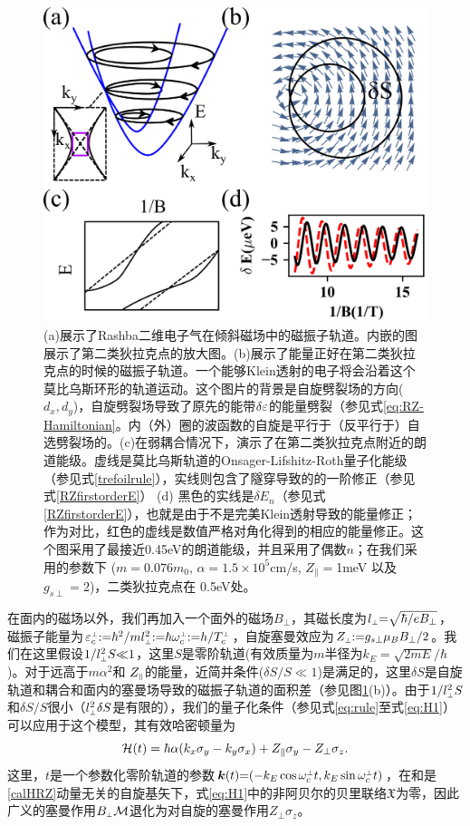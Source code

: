 \begin{figure}
	\includegraphics[width=0.8\columnwidth]{../figures/RZ.png}
	\centering
	\caption{(a)展示了Rashba二维电子气在倾斜磁场中的磁振子轨道。内嵌的图展示了第二类狄拉克点的放大图。(b)展示了能量正好在第二类狄拉克点的时候的磁振子轨道。一个能够Klein透射的电子将会沿着这个莫比乌斯环形的轨道运动。这个图片的背景是自旋劈裂场的方向($d_x,d_y$)，自旋劈裂场导致了原先的能带$\delta\varepsilon$的能量劈裂（参见式\ref{eq:RZ-Hamiltonian}。内（外）圈的波函数的自旋是平行于（反平行于）自选劈裂场的。(c)在弱耦合情况下，演示了在第二类狄拉克点附近的朗道能级。虚线是莫比乌斯轨道的Onsager-Lifshitz-Roth量子化能级（参见式\ref{trefoilrule}），实线则包含了隧穿导致的的一阶修正（参见式\ref{RZfirstorderE}） (d) 黑色的实线是$\delta E_n$（参见式\ref{RZfirstorderE}），也就是由于不是完美Klein透射导致的能量修正；作为对比，红色的虚线是数值严格对角化得到的相应的能量修正。这个图采用了最接近0.45eV的朗道能级，并且采用了偶数$n$；在我们采用的参数下 ($m{=}0.076m_0$, $\alpha{=} 1.5\times10^{5}$cm/s, $Z_\parallel {=}$1meV 以及 $g_{s\perp}=2$)，二类狄拉克点在 0.5eV处。 
	\label{fig:RZ}}
\end{figure}

在面内的磁场以外，我们再加入一个面外的磁场$B_{\perp}$，其磁长度为$l_{\scriptscriptstyle{\perp}}{=}\sqrt{\hbar/eB_{\perp}}$，磁振子能量为$\varepsilon^{\scriptscriptstyle{\perp}}_c{:}{=}\hbar^2/ml_{\scriptscriptstyle{\perp}}^2{:}{=}\hbar \omega_c^{\scriptscriptstyle{\perp}}{:}{=}h/T_c^{\scriptscriptstyle{\perp}}$，自旋塞曼效应为$Z_{\scriptscriptstyle{\perp}}{:}{=}{g_{s\perp}}\mu_B B_{\perp}/2$。我们在这里假设$1/l_{\scriptscriptstyle{\perp}}^2S{\ll}1$，这里$S$是零阶轨道(有效质量为$m$半径为$k_E{=}\sqrt{2mE}/\hbar$)。对于远高于$m\alpha^2$和 $Z_{\scriptscriptstyle{\parallel}}$的能量，近简并条件($\delta S/S{\ll}1$)是满足的，这里$\delta S$是自旋轨道和耦合和面内的塞曼场导致的磁振子轨道的面积差（参见图\ref{fig:RZ}(b)）。由于$1/l_{\scriptscriptstyle{\perp}}^2S$和$\delta S/S$很小（$l_{\scriptscriptstyle{\perp}}^2\delta S$是有限的），我们的量子化条件（参见式\ref{eq:rule}至式\ref{eq:H1}）可以应用于这个模型，其有效哈密顿量为
\begin{equation}
{\cal H}(t)=\hbar\alpha(k_{x}\sigma_{y}-k_{y}\sigma_{x})+Z_\parallel\sigma_{y}-Z_\perp\sigma_{z}.\label{calHRZ}
\end{equation}
这里，$t$是一个参数化零阶轨道的参数$\boldsymbol{k}(t){=}({-}k_E \cos \omega_c^{\scriptscriptstyle{\perp}} t, k_E \sin \omega_c^{\scriptscriptstyle{\perp}} t)$，在和是\ref{calHRZ}动量无关的自旋基矢下，式\ref{eq:H1}中的非阿贝尔的贝里联络$\mathfrak{X}$为零，因此广义的塞曼作用$B_{\scriptscriptstyle{\perp}}{\cal M}$退化为对自旋的塞曼作用$Z_\perp\sigma_{z}$。

